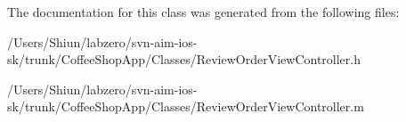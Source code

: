 The documentation for this class was generated from the following files:\begin{DoxyCompactItemize}
\item 
/Users/Shiun/labzero/svn-\/aim-\/ios-\/sk/trunk/CoffeeShopApp/Classes/ReviewOrderViewController.h\item 
/Users/Shiun/labzero/svn-\/aim-\/ios-\/sk/trunk/CoffeeShopApp/Classes/ReviewOrderViewController.m\end{DoxyCompactItemize}
